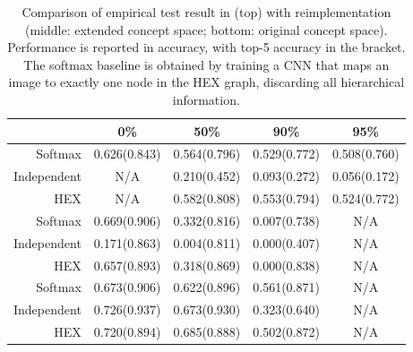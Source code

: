 \documentclass[11pt,a4paper]{article}
\begin{document}
\begin{table}[htbp]
\centering
\begin{tabular}{r|c|c|c|c}
 & 0\% & 50\% & 90\% & 95\%\\
\hline
Softmax     & 0.626(0.843) & 0.564(0.796) & 0.529(0.772) & 0.508(0.760)\\
Independent & N/A          & 0.210(0.452) & 0.093(0.272) & 0.056(0.172)\\
HEX         & N/A          & 0.582(0.808) & 0.553(0.794) & 0.524(0.772)\\
\hline
Softmax     & 0.669(0.906) & 0.332(0.816) & 0.007(0.738) & N/A\\
Independent & 0.171(0.863) & 0.004(0.811) & 0.000(0.407) & N/A\\
HEX         & 0.657(0.893) & 0.318(0.869) & 0.000(0.838) & N/A\\
\hline
Softmax     & 0.673(0.906) & 0.622(0.896) & 0.561(0.871) & N/A\\
Independent & 0.726(0.937) & 0.673(0.930) & 0.323(0.640) & N/A\\
HEX         & 0.720(0.894) & 0.685(0.888) & 0.502(0.872) & N/A
\end{tabular}
\caption{Comparison of empirical test result in \cite{deng2014large} (top) with reimplementation (middle: extended concept space; bottom: original concept space). Performance is reported in accuracy, with top-5 accuracy in the bracket. The softmax baseline is obtained by training a CNN that maps an image to exactly one node in the HEX graph, discarding all hierarchical information.}
\label{tab:original}
\end{table}
\end{document}
